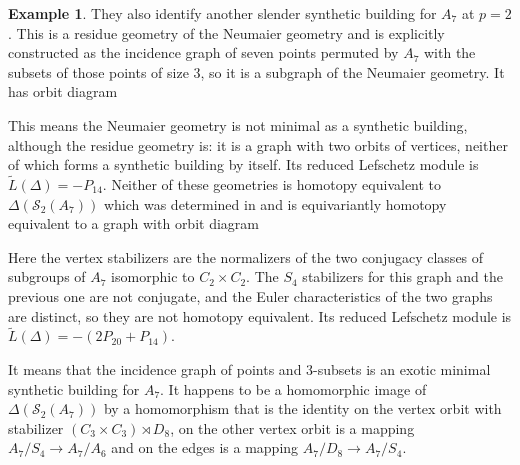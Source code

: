 \documentclass[12pt]{amsart}
\theoremstyle{plain}
\theoremstyle{definition}
\newtheorem{example}[theorem]{Example}
\theoremstyle{remark}
\numberwithin{equation}{section}
\newcommand{\SpCpx}[2]{\Delta(\mathcal{S}_{#2}(#1))}
\begin{document}
\begin{example}
They also identify another slender synthetic building for $A_7$ at $p=2$. This is a residue geometry of the Neumaier geometry and is explicitly constructed as the incidence graph of seven points permuted by $A_7$ with the subsets of those points of size 3, so it is a subgraph of the Neumaier geometry. It has orbit diagram
\begin{center}
\end{center}
This means the Neumaier geometry is not minimal as a synthetic building, although the residue geometry is: it is a graph with two orbits of vertices, neither of which forms a synthetic building by itself. Its reduced Lefschetz module is $\tilde L(\Delta) = -P_{14}$. Neither of these geometries is homotopy equivalent to $\SpCpx{A_7}{2}$ which was determined in \cite{Web1987-1} and is equivariantly homotopy equivalent to a graph with orbit diagram
    \begin{center}
\end{center}
Here the vertex stabilizers are the normalizers of the two conjugacy classes of subgroups of $A_7$ isomorphic to $C_2\times C_2$. The $S_4$ stabilizers for this graph and the previous one are not conjugate, and the Euler characteristics of the two graphs are distinct, so they are not homotopy equivalent. Its reduced Lefschetz module is $\tilde L(\Delta) = -(2P_{20}+P_{14})$.

It means that the incidence graph of points and 3-subsets is an exotic minimal synthetic building for $A_7$. It happens to be a homomorphic image of $\SpCpx{A_7}{2}$ by a homomorphism that is the identity on the vertex orbit with stabilizer $(C_3\times C_3)\rtimes D_8$, on the other vertex orbit is a mapping $A_7/S_4 \to A_7/A_6$ and on the edges is a mapping $A_7/D_8\to A_7/S_4$. 


\end{example}
\end{document}
